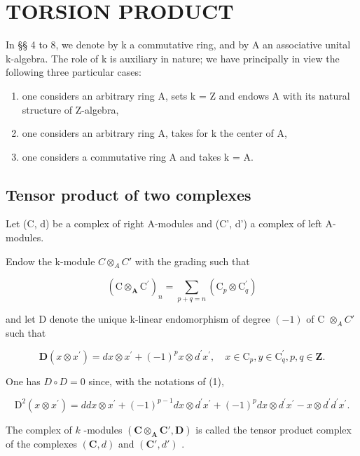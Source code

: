 \section{TORSION PRODUCT}

In §§ 4 to 8, we denote by k a commutative ring, and by A an associative unital k-algebra. The role of k is auxiliary in nature; we have principally in view the following three particular cases:

\begin{enumerate}
\def\labelenumi{\alph{enumi})}
\item
  one considers an arbitrary ring A, sets k = Z and endows A with its natural structure of Z-algebra,
\item
  one considers an arbitrary ring A, takes for k the center of A,
\item
  one considers a commutative ring A and takes k = A.
\end{enumerate}

\subsection{Tensor product of two complexes}

Let (C, d) be a complex of right A-modules and (C', d') a complex of left A-modules.

Endow the k-module \(C \otimes_{A} C'\) with the grading such that

\[
(\mathrm{C} \otimes_ {\mathbf {A}} \mathrm{C} ^ {\prime}) _ {n} = \sum_ {p + q = n} (\mathrm{C} _ {p} \otimes \mathrm{C} _ {q} ^ {\prime})
\]

and let D denote the unique k-linear endomorphism of degree \((-1)\) of C \(\otimes_{A} C'\) such that

\[
\mathbf {D} (x \otimes x ^ {\prime}) = d x \otimes x ^ {\prime} + (- 1) ^ {p} x \otimes d ^ {\prime} x ^ {\prime}, \quad x \in \mathrm{C} _ {p}, y \in \mathrm{C} _ {q} ^ {\prime}, p, q \in \mathbf {Z}. \tag {1}
\]

One has \(D \circ D = 0\) since, with the notations of (1),

\[
\mathrm{D} ^ {2} (x \otimes x ^ {\prime}) = d d x \otimes x ^ {\prime} + (- 1) ^ {p - 1} d x \otimes d ^ {\prime} x ^ {\prime} + (- 1) ^ {p} d x \otimes d ^ {\prime} x ^ {\prime} - x \otimes d ^ {\prime} d ^ {\prime} x ^ {\prime}.
\]

The complex of \(k\) -modules \((\mathbf{C} \otimes_{\mathbf{A}} \mathbf{C}', \mathbf{D})\) is called the tensor product complex of the complexes \((\mathbf{C}, d)\) and \((\mathbf{C}', d')\) .

